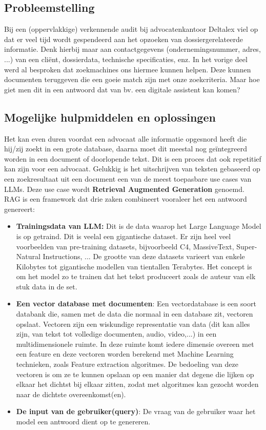 \subsection{Probleemstelling}
Bij een (oppervlakkige) verkennende audit bij advocatenkantoor Deltalex viel op dat er veel tijd wordt gespendeerd aan het opzoeken van dossiergerelateerde informatie.
Denk hierbij maar aan contactgegevens (ondernemingsnummer, adres, ...) van een cliënt, dossierdata, technische specificaties, enz.
In het vorige deel werd al besproken dat zoekmachines ons hiermee kunnen helpen. Deze kunnen documenten teruggeven die een goeie match zijn met onze zoekcriteria.
Maar hoe giet men dit in een antwoord dat van bv. een digitale assistent kan komen?

\subsection{Mogelijke hulpmiddelen en oplossingen}
Het kan even duren voordat een advocaat alle informatie opgesnord heeft die hij/zij zoekt in een grote database, daarna moet dit meestal nog geïntegreerd worden in een document of doorlopende tekst.
Dit is een proces dat ook repetitief kan zijn voor een advocaat.
Gelukkig is het uitschrijven van teksten gebaseerd op een zoekresultaat uit een document een van de meest toepasbare \autocite{MediumRAG} use cases van \Gls{LLM}s.
Deze use case wordt \textbf{Retrieval Augmented Generation} genoemd.\\

RAG is een \Gls{framework} dat drie zaken combineert vooraleer het een antwoord genereert:
\begin{itemize}
	\item \textbf{Trainingsdata van \Gls{LLM}:}
	      Dit is de data waarop het Large Language Model is op getraind. Dit is veelal een gigantische dataset.
	      Er zijn heel veel voorbeelden van pre-training datasets, bijvoorbeeld C4, MassiveText,  Super-Natural Instructions, ... \autocite{ACOoLLM}
	      De grootte van deze datasets varieert van enkele Kilobytes tot gigantische modellen van tientallen Terabytes. \autocite{ACOoLLM}
	      Het concept is om het model zo te trainen dat het tekst produceert zoals de auteur van elk stuk data in de set.
	\item \textbf{Een vector database met documenten}:
	      Een vectordatabase is een soort databank die, samen met de data die normaal in een database zit, vectoren opslaat.
		  Vectoren zijn een wiskundige representatie van data (dit kan alles zijn, van tekst tot volledige documenten, audio, video,...) in een multidimensionele ruimte. 
		  In deze ruimte komt iedere dimensie overeen met een \Gls{feature} en deze vectoren worden berekend met \Gls{Machine Learning} technieken, zoals \Gls{Feature extraction} algoritmes. 
		  De bedoeling van deze vectoren is om ze te kunnen opslaan op een manier dat degene die lijken op elkaar het dichtst bij elkaar zitten, zodat met algoritmes kan gezocht worden naar de dichtste overeenkomst(en). 
	\item \textbf{De input van de gebruiker(query)}: De vraag van de gebruiker waar het model een antwoord dient op te genereren. 
\end{itemize}
\newpage


